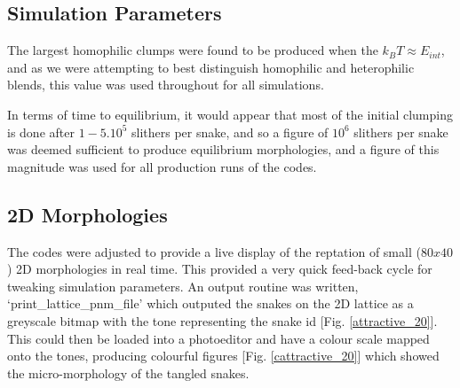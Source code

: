 \documentclass[twocolumn,a4,notitlepage]{report}
\begin{document}
\subsection{Simulation Parameters}

The largest homophilic clumps were found to be produced when
the $k_B T \approx E_{int}$, and as we were attempting to best distinguish
homophilic and heterophilic blends, this value was used throughout for all
simulations.

In terms of time to equilibrium, it would appear that most of the initial
clumping is done after $1-5 . 10^5$ slithers per snake, and so a figure
of $10^6$ slithers per snake was deemed sufficient to produce equilibrium
morphologies, and a figure of this magnitude was used for all production
runs of the codes.

\subsection{2D Morphologies}

The codes were adjusted to provide a live display of the reptation of small ($80x40$) 2D
morphologies in real time. This provided a very quick feed-back cycle for
tweaking simulation parameters. An output routine was written,
`print\_lattice\_pnm\_file' which outputed the snakes on the 2D lattice as a
greyscale bitmap with the tone representing the snake id [Fig. \ref{attractive_20}]. 
This could then be loaded into a photoeditor and have a
colour scale mapped onto the tones, producing colourful figures
[Fig. \ref{cattractive_20}] which showed the micro-morphology of the tangled snakes.
\end{document}
